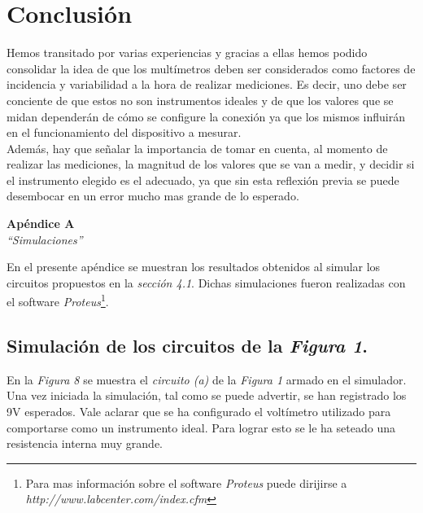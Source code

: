 \documentclass{article}
\begin{document}
\section{Conclusión}

	Hemos transitado por varias experiencias y gracias a ellas hemos podido consolidar la idea de que los multímetros deben ser considerados como factores de incidencia y variabilidad a la hora de realizar mediciones. Es decir, uno debe ser conciente de que estos no son instrumentos ideales y de que los valores que se midan dependerán de cómo se configure la conexión ya que los mismos influirán en el funcionamiento del dispositivo a mesurar. \\
\indent Además, hay que señalar la importancia  de tomar en cuenta, al momento de realizar las mediciones, la magnitud de los valores que se van a medir, y decidir si el instrumento elegido es el adecuado, ya que sin esta reflexión previa se puede desembocar en un error mucho mas grande de lo esperado.  





\newpage
\vspace*{4cm}
\begin{center}
	\textbf{\Huge{Apéndice A}} \\
	\bigskip\bigskip
	\Large{\textit{``Simulaciones''}}
\end{center}


\newpage

	En el presente apéndice se muestran los resultados obtenidos al simular los circuitos propuestos en la \textit{sección 4.1}. Dichas simulaciones fueron realizadas con el software \textit{Proteus}\footnote{Para mas información sobre el software \textit{Proteus} puede dirijirse a \textit{http://www.labcenter.com/index.cfm}}.
\bigskip \bigskip


\subsection*{Simulación de los circuitos de la \textit{Figura 1}.}
\medskip

	En la \textit{Figura 8} se muestra el \textit{circuito (a)} de la \textit{Figura 1} armado en el simulador. Una vez iniciada la simulación, tal como se puede advertir, se han registrado los 9V esperados. Vale aclarar que se ha configurado el voltímetro utilizado para comportarse como un instrumento ideal. Para lograr esto se le ha seteado una resistencia interna muy grande.
\medskip
\end{document}
